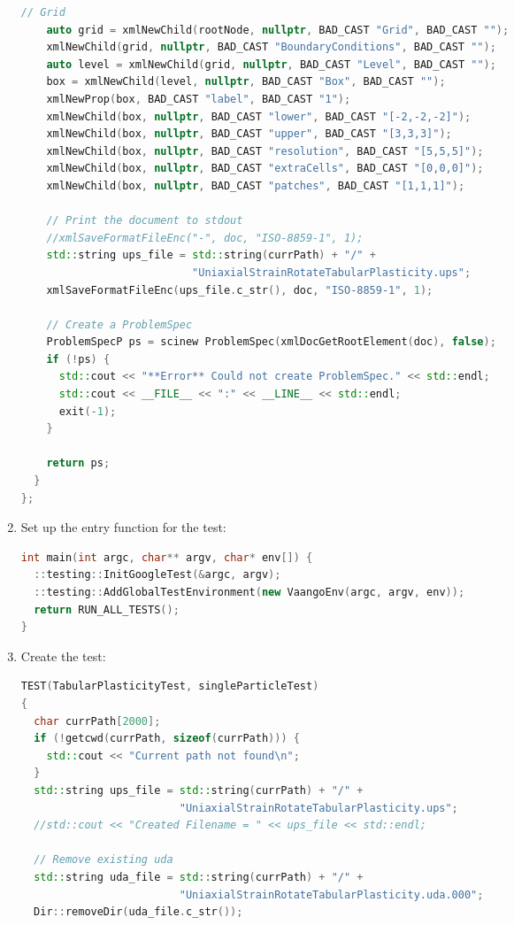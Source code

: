 \begin{enumerate}
\begin{lstlisting}[language=Cpp]
    // Grid
    auto grid = xmlNewChild(rootNode, nullptr, BAD_CAST "Grid", BAD_CAST "");
    xmlNewChild(grid, nullptr, BAD_CAST "BoundaryConditions", BAD_CAST "");
    auto level = xmlNewChild(grid, nullptr, BAD_CAST "Level", BAD_CAST "");
    box = xmlNewChild(level, nullptr, BAD_CAST "Box", BAD_CAST "");
    xmlNewProp(box, BAD_CAST "label", BAD_CAST "1");
    xmlNewChild(box, nullptr, BAD_CAST "lower", BAD_CAST "[-2,-2,-2]");
    xmlNewChild(box, nullptr, BAD_CAST "upper", BAD_CAST "[3,3,3]");
    xmlNewChild(box, nullptr, BAD_CAST "resolution", BAD_CAST "[5,5,5]");
    xmlNewChild(box, nullptr, BAD_CAST "extraCells", BAD_CAST "[0,0,0]");
    xmlNewChild(box, nullptr, BAD_CAST "patches", BAD_CAST "[1,1,1]");

    // Print the document to stdout
    //xmlSaveFormatFileEnc("-", doc, "ISO-8859-1", 1);
    std::string ups_file = std::string(currPath) + "/" + 
                           "UniaxialStrainRotateTabularPlasticity.ups";
    xmlSaveFormatFileEnc(ups_file.c_str(), doc, "ISO-8859-1", 1);

    // Create a ProblemSpec
    ProblemSpecP ps = scinew ProblemSpec(xmlDocGetRootElement(doc), false);
    if (!ps) {
      std::cout << "**Error** Could not create ProblemSpec." << std::endl;
      std::cout << __FILE__ << ":" << __LINE__ << std::endl;
      exit(-1);
    }

    return ps;
  }
};
\end{lstlisting}

  \item Set up the entry function for the test:
\begin{lstlisting}[language=Cpp]
int main(int argc, char** argv, char* env[]) {
  ::testing::InitGoogleTest(&argc, argv);
  ::testing::AddGlobalTestEnvironment(new VaangoEnv(argc, argv, env));
  return RUN_ALL_TESTS();
}
\end{lstlisting}

  \item Create the test:
\begin{lstlisting}[language=Cpp]
TEST(TabularPlasticityTest, singleParticleTest)
{
  char currPath[2000];
  if (!getcwd(currPath, sizeof(currPath))) {
    std::cout << "Current path not found\n";
  }
  std::string ups_file = std::string(currPath) + "/" + 
                         "UniaxialStrainRotateTabularPlasticity.ups";
  //std::cout << "Created Filename = " << ups_file << std::endl;

  // Remove existing uda
  std::string uda_file = std::string(currPath) + "/" + 
                         "UniaxialStrainRotateTabularPlasticity.uda.000";
  Dir::removeDir(uda_file.c_str());


\end{lstlisting}
\end{enumerate}
